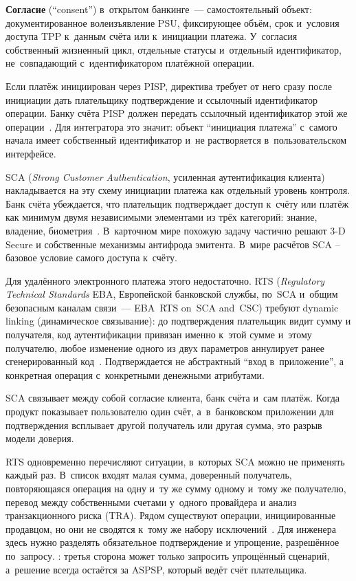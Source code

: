 \textbf{Согласие} (\enquote{consent}) в~открытом банкинге~--- самостоятельный
объект: документированное волеизъявление PSU, фиксирующее объём,
срок и~условия доступа TPP к~данным счёта или к~инициации платежа.
У~согласия собственный жизненный цикл, отдельные статусы и~отдельный
идентификатор, не~совпадающий с~идентификатором платёжной операции.

Если платёж инициирован через PISP, директива требует от него сразу
после инициации дать плательщику подтверждение и ссылочный
идентификатор операции. Банку счёта PISP должен передать ссылочный
идентификатор этой же операции~\cite{psd2}. Для интегратора это значит: объект
\enquote{инициация платежа} с~самого начала имеет собственный
идентификатор и~не растворяется в~пользовательском интерфейсе.

SCA (\textit{Strong Customer Authentication}, усиленная аутентификация
клиента) накладывается на эту схему инициации платежа как отдельный
уровень контроля. Банк
счёта убеждается, что плательщик подтверждает доступ к~счёту
или платёж как минимум двумя независимыми элементами из трёх
категорий: знание, владение, биометрия~\cite{eba-rts-sca}. В~карточном
мире похожую задачу частично решают 3-D Secure и собственные
механизмы антифрода эмитента. В~мире расчётов SCA -- базовое условие
самого доступа к~счёту.

Для удалённого электронного платежа этого недостаточно.
RTS (\textit{Regulatory Technical Standards} EBA, Европейской банковской
службы, по~SCA и~общим безопасным каналам связи~--- EBA~RTS on~SCA and~CSC) требуют
dynamic linking (динамическое связывание): до подтверждения плательщик видит сумму
и получателя, код аутентификации привязан именно к~этой сумме
и~этому получателю, любое изменение одного из двух параметров
аннулирует ранее сгенерированный код~\cite{eba-rts-sca}.
Подтверждается не абстрактный \enquote{вход в~приложение},
а конкретная операция с~конкретными денежными атрибутами.

SCA связывает между собой согласие клиента, банк счёта и~сам платёж.
Когда продукт показывает пользователю один счёт, а~в~банковском
приложении для подтверждения всплывает другой получатель или другая
сумма, это разрыв модели доверия.

RTS одновременно перечисляют ситуации, в~которых SCA можно
не применять каждый раз. В~список входят малая сумма, доверенный
получатель, повторяющаяся операция на одну и~ту же сумму одному
и~тому же получателю, перевод между собственными счетами у~одного
провайдера и анализ транзакционного риска (TRA). Рядом существуют
операции, инициированные продавцом, но они не сводятся к~тому же
набору исключений~\cite{eba-rts-sca}. Для инженера здесь нужно
разделять обязательное подтверждение и упрощение, разрешённое
по~запросу. :
третья сторона может только запросить упрощённый сценарий, а~решение
всегда остаётся за ASPSP, который ведёт счёт плательщика.

